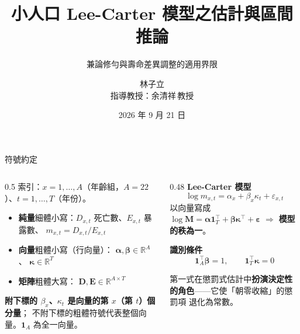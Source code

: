 \documentclass[aspectratio=169, UTF8, fontset=macnew, 11pt]{ctexbeamer}
\title[小人口 LC 模型]{小人口 Lee-Carter 模型之估計與區間推論}
\subtitle{兼論修勻與壽命差異調整的適用界限}
\author[林子立]{林子立\\[4pt]\small 指導教授：余清祥\,教授}
\institute{國立政治大學統計學系}
\date{2026 年 9 月 21 日}
\newcommand{\hi}[1]{\textcolor{red!70!black}{\textbf{#1}}}
\newcommand{\gd}[1]{\textcolor{green!45!black}{\textbf{#1}}}
\begin{document}
\begin{frame}[plain]
\titlepage
\end{frame}

\begin{frame}{符號約定}
\begin{columns}[T]
\begin{column}{0.5\textwidth}
\small
索引：$x=1,\dots,A$（年齡組，$A=22$）、$t=1,\dots,T$（年份）。
\vspace{6pt}

\begin{itemize}\small
  \item \textbf{純量}細體小寫：$D_{x,t}$ 死亡數、$E_{x,t}$ 暴露數、
        $m_{x,t}=D_{x,t}/E_{x,t}$
  \item \textbf{向量}粗體小寫（行向量）：
        $\boldsymbol{\alpha},\boldsymbol{\beta}\in\mathbb{R}^{A}$、
        $\boldsymbol{\kappa}\in\mathbb{R}^{T}$
  \item \textbf{矩陣}粗體大寫：
        $\mathbf{D},\mathbf{E}\in\mathbb{R}^{A\times T}$
\end{itemize}
\vspace{4pt}
\footnotesize
\hi{附下標的 $\beta_x$、$\kappa_t$ 是向量的第 $x$（第 $t$）個分量}；
不附下標的粗體符號代表整個向量。$\mathbf{1}_A$ 為全一向量。
\end{column}
\begin{column}{0.48\textwidth}
\small
\textbf{Lee-Carter 模型}
\[
\log m_{x,t}=\alpha_x+\beta_x\kappa_t+\varepsilon_{x,t}
\]
以向量寫成
$\log\mathbf{M}=\boldsymbol{\alpha}\mathbf{1}_T^{\!\top}
+\boldsymbol{\beta}\boldsymbol{\kappa}^{\!\top}+\boldsymbol{\varepsilon}$
$\Rightarrow$ \gd{模型的秩為一}。
\vspace{8pt}

\textbf{識別條件}
\[
\mathbf{1}_A^{\!\top}\boldsymbol{\beta}=1,\qquad
\mathbf{1}_T^{\!\top}\boldsymbol{\kappa}=0
\]
\vspace{-6pt}
\begin{alertblock}{}
\footnotesize
第一式在懲罰式估計中\hi{扮演決定性的角色}——它使「朝零收縮」的懲罰項
退化為常數。
\end{alertblock}
\end{column}
\end{columns}
\end{frame}
\end{document}
